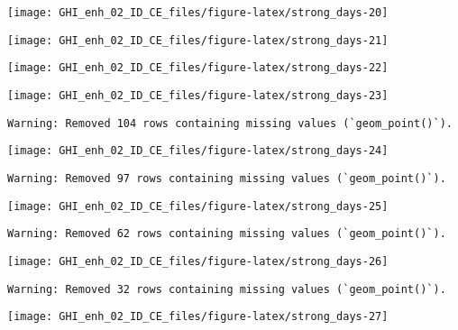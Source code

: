 \documentclass[
  10pt,
  a4paper,oneside]{article}
\begin{document}
\begin{center}\texttt{[image: GHI\_enh\_02\_ID\_CE\_files/figure-latex/strong\_days-20]} \end{center}

\begin{center}\texttt{[image: GHI\_enh\_02\_ID\_CE\_files/figure-latex/strong\_days-21]} \end{center}

\begin{center}\texttt{[image: GHI\_enh\_02\_ID\_CE\_files/figure-latex/strong\_days-22]} \end{center}

\begin{center}\texttt{[image: GHI\_enh\_02\_ID\_CE\_files/figure-latex/strong\_days-23]} \end{center}

\begin{verbatim}
Warning: Removed 104 rows containing missing values (`geom_point()`).
\end{verbatim}

\begin{center}\texttt{[image: GHI\_enh\_02\_ID\_CE\_files/figure-latex/strong\_days-24]} \end{center}

\begin{verbatim}
Warning: Removed 97 rows containing missing values (`geom_point()`).
\end{verbatim}

\begin{center}\texttt{[image: GHI\_enh\_02\_ID\_CE\_files/figure-latex/strong\_days-25]} \end{center}

\begin{verbatim}
Warning: Removed 62 rows containing missing values (`geom_point()`).
\end{verbatim}

\begin{center}\texttt{[image: GHI\_enh\_02\_ID\_CE\_files/figure-latex/strong\_days-26]} \end{center}

\begin{verbatim}
Warning: Removed 32 rows containing missing values (`geom_point()`).
\end{verbatim}

\begin{center}\texttt{[image: GHI\_enh\_02\_ID\_CE\_files/figure-latex/strong\_days-27]} \end{center}
\end{document}
